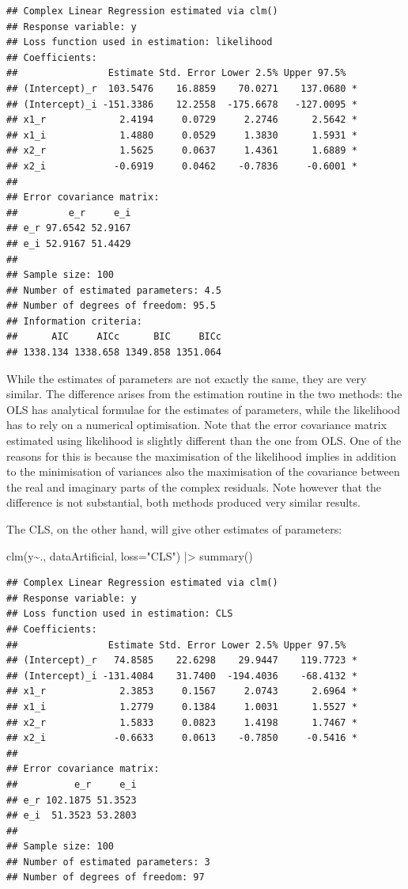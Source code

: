 \documentclass[
]{book}
\newenvironment{Shaded}{\begin{snugshade}}{\end{snugshade}}
\newcommand{\AttributeTok}[1]{\textcolor[rgb]{0.77,0.63,0.00}{#1}}
\newcommand{\FunctionTok}[1]{\textcolor[rgb]{0.00,0.00,0.00}{#1}}
\newcommand{\NormalTok}[1]{#1}
\newcommand{\SpecialCharTok}[1]{\textcolor[rgb]{0.00,0.00,0.00}{#1}}
\newcommand{\StringTok}[1]{\textcolor[rgb]{0.31,0.60,0.02}{#1}}
\begin{document}
\begin{verbatim}
## Complex Linear Regression estimated via clm()
## Response variable: y
## Loss function used in estimation: likelihood
## Coefficients:
##                Estimate Std. Error Lower 2.5% Upper 97.5%  
## (Intercept)_r  103.5476    16.8859    70.0271    137.0680 *
## (Intercept)_i -151.3386    12.2558  -175.6678   -127.0095 *
## x1_r             2.4194     0.0729     2.2746      2.5642 *
## x1_i             1.4880     0.0529     1.3830      1.5931 *
## x2_r             1.5625     0.0637     1.4361      1.6889 *
## x2_i            -0.6919     0.0462    -0.7836     -0.6001 *
## 
## Error covariance matrix:
##         e_r     e_i
## e_r 97.6542 52.9167
## e_i 52.9167 51.4429
## 
## Sample size: 100
## Number of estimated parameters: 4.5
## Number of degrees of freedom: 95.5
## Information criteria:
##      AIC     AICc      BIC     BICc 
## 1338.134 1338.658 1349.858 1351.064
\end{verbatim}

While the estimates of parameters are not exactly the same, they are very similar. The difference arises from the estimation routine in the two methods: the OLS has analytical formulae for the estimates of parameters, while the likelihood has to rely on a numerical optimisation. Note that the error covariance matrix estimated using likelihood is slightly different than the one from OLS. One of the reasons for this is because the maximisation of the likelihood implies in addition to the minimisation of variances also the maximisation of the covariance between the real and imaginary parts of the complex residuals. Note however that the difference is not substantial, both methods produced very similar results.

The CLS, on the other hand, will give other estimates of parameters:

\begin{Shaded}
\begin{Highlighting}[]
\FunctionTok{clm}\NormalTok{(y}\SpecialCharTok{\textasciitilde{}}\NormalTok{., dataArtificial, }\AttributeTok{loss=}\StringTok{"CLS"}\NormalTok{) }\SpecialCharTok{|\textgreater{}}
    \FunctionTok{summary}\NormalTok{()}
\end{Highlighting}
\end{Shaded}

\begin{verbatim}
## Complex Linear Regression estimated via clm()
## Response variable: y
## Loss function used in estimation: CLS
## Coefficients:
##                Estimate Std. Error Lower 2.5% Upper 97.5%  
## (Intercept)_r   74.8585    22.6298    29.9447    119.7723 *
## (Intercept)_i -131.4084    31.7400  -194.4036    -68.4132 *
## x1_r             2.3853     0.1567     2.0743      2.6964 *
## x1_i             1.2779     0.1384     1.0031      1.5527 *
## x2_r             1.5833     0.0823     1.4198      1.7467 *
## x2_i            -0.6633     0.0613    -0.7850     -0.5416 *
## 
## Error covariance matrix:
##          e_r     e_i
## e_r 102.1875 51.3523
## e_i  51.3523 53.2803
## 
## Sample size: 100
## Number of estimated parameters: 3
## Number of degrees of freedom: 97
\end{verbatim}
\end{document}
